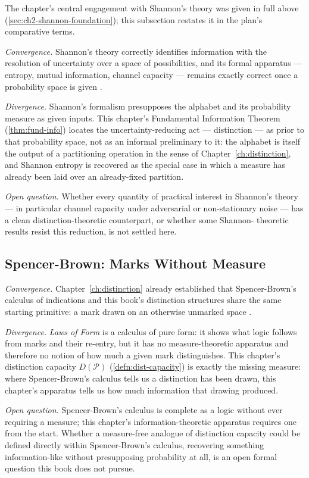 \documentclass[12pt,twoside,openright]{book}
\newcommand{\partition}{\mathcal{P}}
\begin{document}
The chapter's central engagement with Shannon's theory was
given in full above (\cref{sec:ch2-shannon-foundation}); this
subsection restates it in the plan's comparative terms.

\emph{Convergence.} Shannon's theory correctly identifies
information with the resolution of uncertainty over a space of
possibilities, and its formal apparatus --- entropy, mutual
information, channel capacity --- remains exactly correct once
a probability space is given \parencite{shannon1948,shannon1949}.

\emph{Divergence.} Shannon's formalism presupposes the
alphabet and its probability measure as given inputs. This
chapter's Fundamental Information Theorem
(\cref{thm:fund-info}) locates the uncertainty-reducing act ---
distinction --- as prior to that probability space, not as an
informal preliminary to it: the alphabet is itself the output
of a partitioning operation in the sense of
Chapter~\ref{ch:distinction}, and Shannon entropy is recovered
as the special case in which a measure has already been laid
over an already-fixed partition.

\emph{Open question.} Whether every quantity of practical
interest in Shannon's theory --- in particular channel capacity
under adversarial or non-stationary noise --- has a clean
distinction-theoretic counterpart, or whether some Shannon-
theoretic results resist this reduction, is not settled here.

\subsection*{Spencer-Brown: Marks Without Measure}

\emph{Convergence.} Chapter~\ref{ch:distinction} already
established that Spencer-Brown's calculus of indications and
this book's distinction structures share the same starting
primitive: a mark drawn on an otherwise unmarked space
\parencite{spencer-brown1969}.

\emph{Divergence.} \emph{Laws of Form} is a calculus of pure
form: it shows what logic follows from marks and their
re-entry, but it has no measure-theoretic apparatus and
therefore no notion of how much a given mark distinguishes.
This chapter's distinction capacity $D(\partition)$
(\cref{defn:dist-capacity}) is exactly the missing measure:
where Spencer-Brown's calculus tells us a distinction has been
drawn, this chapter's apparatus tells us how much information
that drawing produced.

\emph{Open question.} Spencer-Brown's calculus is complete as a
logic without ever requiring a measure; this chapter's
information-theoretic apparatus requires one from the start.
Whether a measure-free analogue of distinction capacity could
be defined directly within Spencer-Brown's calculus, recovering
something information-like without presupposing probability at
all, is an open formal question this book does not pursue.
\end{document}

